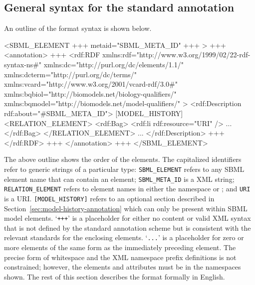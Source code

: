 \clearpage

\subsection{General syntax for the standard annotation}

An outline of the format syntax is shown below.

\vspace*{0.1ex}

\begin{example}
<SBML_ELEMENT +++ metaid="SBML_META_ID" +++ >
  +++
  <annotation>
    +++
    <rdf:RDF
      xmlns:rdf="http://www.w3.org/1999/02/22-rdf-syntax-ns\#"
      xmlns:dc="http://purl.org/dc/elements/1.1/"
      xmlns:dcterm="http://purl.org/dc/terms/"
      xmlns:vcard="http://www.w3.org/2001/vcard-rdf/3.0\#"
      xmlns:bqbiol="http://biomodels.net/biology-qualifiers/"
      xmlns:bqmodel="http://biomodels.net/model-qualifiers/"
    >
      <rdf:Description rdf:about="#SBML_META_ID">
        [MODEL_HISTORY]
        <RELATION_ELEMENT>
          <rdf:Bag>
            <rdf:li rdf:resource="URI" />
            ...
          </rdf:Bag>
        </RELATION_ELEMENT>
        ...
      </rdf:Description>
      +++
    </rdf:RDF>
    +++
  </annotation>
  +++
</SBML_ELEMENT>
\end{example}

The above outline shows the order of the elements. The capitalized
identifiers refer to generic strings of a particular type:
\texttt{SBML\_ELEMENT} refers to any SBML element name that can
contain an  element; \texttt{SBML\_META\_ID} is
a XML  string; \texttt{RELATION\_ELEMENT} refers to
element names in either the namespace
 or
; and \texttt{URI} is
a URI.  \texttt{[MODEL\_HISTORY]} refers to an optional section
described in Section~\ref{sec:model-history-annotation} which can
only be present within SBML model elements. `\texttt{+++}' is a
placeholder for either no content or valid XML syntax that is not
defined by the standard annotation scheme but is consistent with
the relevant standards for the enclosing elements. `\texttt{...}'
is a placeholder for zero or more elements of the same form as the
immediately preceding element.  The precise form of whitespace and
the XML namespace prefix definitions is not constrained; however,
the elements and attributes must be in the namespaces shown. The
rest of this section describes the format formally in English.


